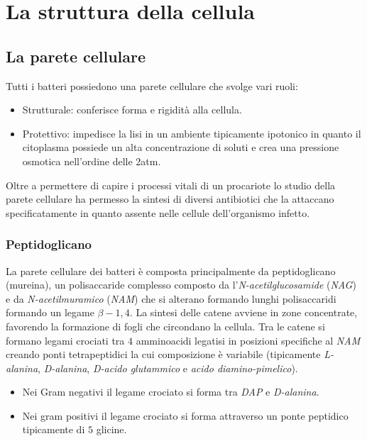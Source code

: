 \chapter{La struttura della cellula}
\section{La parete cellulare}
Tutti i batteri possiedono una parete cellulare che svolge vari ruoli:
\begin{itemize}
	\item Strutturale: conferisce forma e rigidit\`a alla cellula.
	\item Protettivo: impedisce la lisi in un ambiente tipicamente ipotonico in quanto il citoplasma possiede un alta concentrazione di soluti e crea una pressione osmotica
		nell'ordine delle $2$\si{atm}.
\end{itemize}
Oltre a permettere di capire i processi vitali di un procariote lo studio della parete cellulare ha permesso la sintesi di diversi antibiotici che la attaccano specificatamente in
quanto assente nelle cellule dell'organismo infetto.
\subsection{Peptidoglicano}
La parete cellulare dei batteri \`e composta principalmente da peptidoglicano (mureina), un polisaccaride complesso composto da l'\emph{N-acetilglucosamide} (\emph{NAG}) e da
\emph{N-acetilmuramico} (\emph{NAM}) che si alterano formando lunghi polisaccaridi formando un legame $\beta-1,4$. La sintesi delle catene avviene in zone concentrate, favorendo
la formazione di fogli che circondano la cellula. Tra le catene si formano legami crociati tra $4$ amminoacidi legatisi in posizioni specifiche al \emph{NAM} creando ponti tetrapeptidici
la cui composizione \`e variabile (tipicamente \emph{L-alanina}, \emph{D-alanina}, \emph{D-acido glutammico} e \emph{acido diamino-pimelico}).
\begin{itemize}
	\item Nei Gram negativi il legame crociato si forma tra \emph{DAP} e \emph{D-alanina}.
	\item Nei gram positivi il legame crociato si forma attraverso un ponte peptidico tipicamente di $5$ glicine.
\end{itemize}
